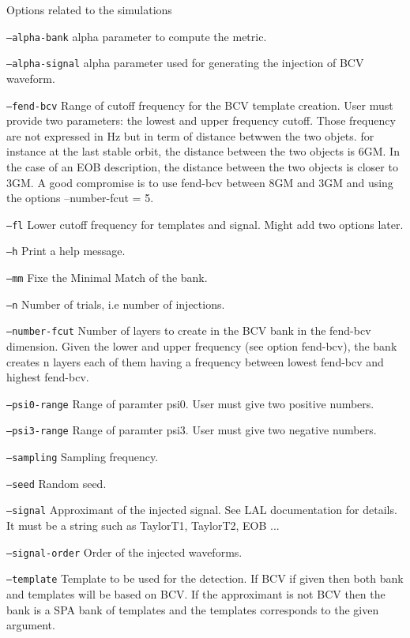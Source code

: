 \begin{entry}
\item[Options related to the simulations]\leavevmode
\begin{entry}
\item[\texttt{--alpha-bank}]
alpha parameter to compute the metric.
\item[\texttt{--alpha-signal}]
alpha parameter used for generating the  injection of BCV waveform.
\item[\texttt{--fend-bcv}]
Range of cutoff frequency for the BCV template creation. User must provide two parameters: 
the lowest and upper frequency cutoff. Those frequency are not expressed in Hz but in term
of distance betwwen the two objets. for instance at the last stable orbit, the distance 
between the two objects is 6GM. In the case of an EOB description, the distance between 
the two objects is closer to 3GM. A good compromise is to use fend-bcv between 8GM and 3GM
and using the options --number-fcut = 5. 
\item[\texttt{--fl}]
Lower cutoff frequency for templates and signal. Might add two options later. 
\item[\texttt{--h}]
Print a help message.
\item[\texttt{--mm}]
Fixe the Minimal Match of the bank.
\item[\texttt{--n}]
Number of trials, i.e number of injections.
\item[\texttt{--number-fcut}]
Number of layers to create in the BCV bank in the fend-bcv dimension. 
Given the lower and upper frequency (see option fend-bcv), the bank creates
n layers each of them having a frequency between lowest fend-bcv and highest fend-bcv.
\item[\texttt{--psi0-range}]
Range of paramter psi0. User must give two positive numbers.
\item[\texttt{--psi3-range}]
Range of paramter psi3. User must give two negative numbers.
\item[\texttt{--sampling}]
Sampling frequency.
\item[\texttt{--seed}]
Random seed.
\item[\texttt{--signal}]
Approximant of the injected signal. See LAL documentation for details. It must be a string
such as TaylorT1, TaylorT2, EOB ...
\item[\texttt{--signal-order}]
Order of the injected waveforms.
\item[\texttt{--template}]
Template to be used for the detection. If BCV if given then both bank and templates will be
based on BCV. If the approximant is not BCV then the bank is a SPA bank of templates and the 
templates corresponds to the given argument.
\end{entry}





\end{entry}
